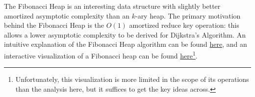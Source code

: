 The Fibonacci Heap is an interesting data structure with slightly better amortized asymptotic complexity than an $k$-ary heap.  The primary motivation behind the Fibonacci Heap is the $O(1)$ amortized reduce key operation: this allows a lower asymptotic complexity to be derived for Dijkstra's Algorithm.  An intuitive explanation of the Fibonacci Heap algorithm can be found \href{http://www.cs.princeton.edu/~wayne/teaching/fibonacci-heap.pdf}{here}, and an interactive visualization of a Fibonacci heap can be found \href{http://www.cs.usfca.edu/~galles/visualization/FibonacciHeap.html}{here}\footnote{Unfortunately, this visualization is more limited in the scope of its operations than the analysis here, but it suffices to get the key ideas across.}.
